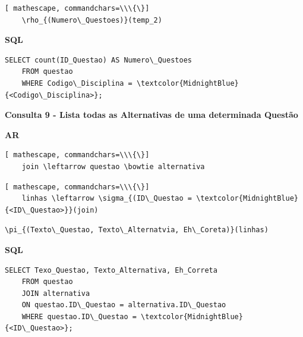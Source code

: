 \documentclass[12pt,a4paper]{article}
\begin{document}
\begin{Verbatim}[ mathescape, commandchars=\\\{\}]
    \rho_{(Numero\_Questoes)}(temp_2)
\end{Verbatim}

\begin{center}
    \textbf{SQL}
\end{center}
\begin{Verbatim}[commandchars=\\\{\}]
    SELECT count(ID_Questao) AS Numero\_Questoes
    FROM questao
    WHERE Codigo\_Disciplina = \textcolor{MidnightBlue}{<Codigo\_Disciplina>};
\end{Verbatim}

\vspace{0.5cm}
\begin{center}
    \textbf{Consulta 9 - Lista todas as Alternativas de uma determinada Questão }
\end{center}
\begin{center}
    \textbf{AR}
\end{center}

\begin{Verbatim}[ mathescape, commandchars=\\\{\}]
    join \leftarrow questao \bowtie alternativa 
\end{Verbatim}

\begin{Verbatim}[ mathescape, commandchars=\\\{\}]
    linhas \leftarrow \sigma_{(ID\_Questao = \textcolor{MidnightBlue}{<ID\_Questao>}}(join)
\end{Verbatim}

\begin{Verbatim}[mathescape, commandchars=\\\{\}]
    \pi_{(Texto\_Questao, Texto\_Alternatvia, Eh\_Coreta)}(linhas)
\end{Verbatim}

\pagebreak
\begin{center}
    \textbf{SQL}
\end{center}
\begin{Verbatim}[commandchars=\\\{\}]
    SELECT Texo_Questao, Texto_Alternativa, Eh_Correta
    FROM questao 
    JOIN alternativa 
    ON questao.ID\_Questao = alternativa.ID\_Questao 
    WHERE questao.ID\_Questao = \textcolor{MidnightBlue}{<ID\_Questao>};
\end{Verbatim}
\end{document}
